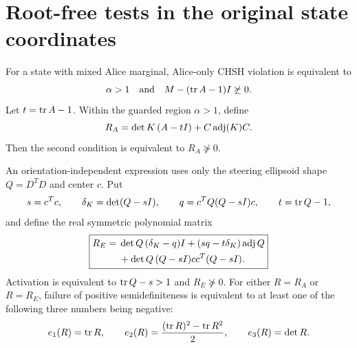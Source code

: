 \section{Root-free tests in the original state coordinates}
\label{sec:ext-polynomial}

\begin{theorem}
\label{thm:ext-polynomial}
For a state with mixed Alice marginal, Alice-only CHSH violation is
equivalent to
\begin{equation}
 \alpha>1
 \quad\text{and}\quad
 M-(\operatorname{tr} A-1)I\not\succeq0.
 \label{eq:ext-activation}
\end{equation}
Let $t=\operatorname{tr} A-1$. Within the guarded region $\alpha>1$, define
\begin{equation}
 R_A=\det K\,(A-tI)+C\operatorname{adj}(K)C.
 \label{eq:ext-polynomial-R}
\end{equation}
Then the second condition is equivalent to $R_A\not\succeq0$.

An orientation-independent expression uses only the steering ellipsoid
shape $Q=D^TD$ and center $c$. Put
\[
 s=c^Tc,\qquad \delta_K=\det(Q-sI),\qquad
 q=c^TQ(Q-sI)c,\qquad t=\operatorname{tr} Q-1,
\]
and define the real symmetric polynomial matrix
\begin{equation}
 \boxed{\begin{aligned}
 R_E={}&\det Q\,(\delta_K-q)I
       +(s q-t\delta_K)\operatorname{adj} Q\\
      &+\det Q\,(Q-sI)cc^T(Q-sI).
 \end{aligned}}
 \label{eq:ext-ellipsoid-R}
\end{equation}
Activation is equivalent to
$\operatorname{tr} Q-s>1$ and $R_E\not\succeq0$.
For either $R=R_A$ or $R=R_E$, failure of positive semidefiniteness is
equivalent to at least one of the following three numbers being negative:
\begin{equation}
 e_1(R)=\operatorname{tr} R,\qquad
 e_2(R)=\frac{(\operatorname{tr} R)^2-\operatorname{tr} R^2}{2},\qquad
 e_3(R)=\det R.
 \label{eq:ext-three-signs}
\end{equation}
\end{theorem}

